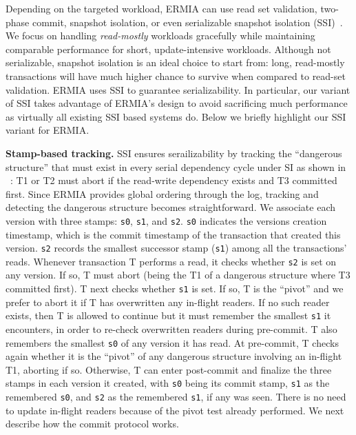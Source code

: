 Depending on the targeted workload, ERMIA can use read set validation, two-phase commit, snapshot isolation, or even serializable snapshot isolation (SSI)~\cite{Cahill08RF}. We focus on handling \textit{read-mostly} workloads gracefully while maintaining comparable performance for short, update-intensive workloads. Although not serializable, snapshot isolation is an ideal choice to start from: long, read-mostly transactions will have much higher chance to survive when compared to read-set validation. ERMIA uses SSI to guarantee serializability. In particular, our variant of SSI takes advantage of ERMIA's design to avoid sacrificing much performance as virtually all existing SSI based systems do. Below we briefly highlight our SSI variant for ERMIA.


{\bf Stamp-based tracking.}
SSI ensures serailizability by tracking the ``dangerous structure'' that must exist in every serial dependency cycle under SI as shown in ~\cite{Cahill08RF}: T1 or T2 must abort if the read-write dependency exists and T3 committed first. Since ERMIA provides global ordering through the log, tracking and detecting the dangerous structure becomes straightforward. We associate each version with three stamps: \texttt{s0}, \texttt{s1}, and \texttt{s2}. \texttt{s0} indicates the versions creation timestamp, which is the commit timestamp of the transaction that created this version. \texttt{s2} records the smallest successor stamp (\texttt{s1}) among all the transactions' reads. Whenever transaction T performs a read, it checks whether \texttt{s2} is set on any version. If so, T must abort (being the T1 of a dangerous structure where T3 committed first). T next checks whether \texttt{s1} is set. If so, T is the ``pivot'' and we prefer to abort it if T has overwritten any in-flight readers. If no such reader exists, then T is allowed to continue but it must remember the smallest \texttt{s1} it encounters, in order to re-check overwritten readers during pre-commit. T also remembers the smallest \texttt{s0} of any version it has read. At pre-commit, T checks again whether it is the ``pivot'' of any dangerous structure involving an in-flight T1, aborting if so. Otherwise, T can enter post-commit and finalize the three stamps in each version it created, with \texttt{s0} being its commit stamp, \texttt{s1} as the remembered \texttt{s0}, and \texttt{s2} as the remembered \texttt{s1}, if any was seen. There is no need to update in-flight readers because of the pivot test already performed. We next describe how the commit protocol works.

